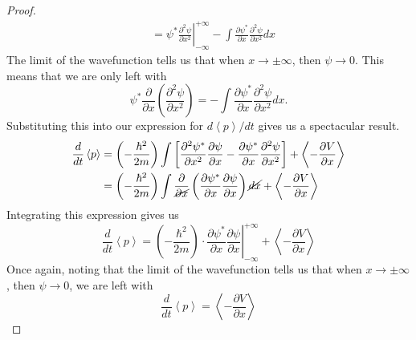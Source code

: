 \begin{sol}
\begin{enumerate}[label=\textbf{(\alph*)}]
\begin{proof}
\begin{align*}
    &= \psi^*\left.\frac{\partial^2\psi}{\partial x^2}\right|_{-\infty}^{+\infty} - \int \frac{\partial \psi^*}{\partial x}\frac{\partial^2\psi}{\partial x^2}dx
\end{align*}
The limit of the wavefunction tells us that when $x\to\pm\infty$, then $\psi\to 0$. This means that we are only left with 
\[\psi^*\frac{\partial}{\partial x}\left(\frac{\partial^2\psi}{\partial x^2}\right) = - \int \frac{\partial \psi^*}{\partial x}\frac{\partial^2\psi}{\partial x^2}dx.\]
Substituting this into our expression for $d\left<p\right>/dt$ gives us a spectacular result. 
\begin{align*}
    \frac{d}{dt}\left<p\right> &= \left(-\frac{\hbar^2}{2m}\right)\int\left[\frac{\partial^2\psi^*}{\partial x^2}\frac{\partial \psi}{\partial x} - \frac{\partial \psi^*}{\partial x}\frac{\partial^2\psi}{\partial x^2}\right] + \left<-\frac{\partial V}{\partial x}\right>\\
    &= \left(-\frac{\hbar^2}{2m}\right)\int \frac{\partial}{\cancel{\partial x}}\left(\frac{\partial \psi^*}{\partial x}\frac{\partial \psi}{\partial x}\right)\cancel{dx} + \left<-\frac{\partial V}{\partial x}\right>
\end{align*}
Integrating this expression gives us 
\[\frac{d}{dt}\left<p\right> = \left(-\frac{\hbar^2}{2m}\right) \cdot \left.\frac{\partial \psi^*}{\partial x}\frac{\partial \psi}{\partial x}\right|_{-\infty}^{+\infty} + \left<-\frac{\partial V}{\partial x}\right>\]
Once again, noting that the limit of the wavefunction tells us that when $x\to\pm\infty$, then $\psi\to 0$, we are left with 
\[\boxed{\frac{d}{dt}\left<p\right> = \left<-\frac{\partial V}{\partial x}\right>}\]
\end{proof}
\end{enumerate}
\end{sol}